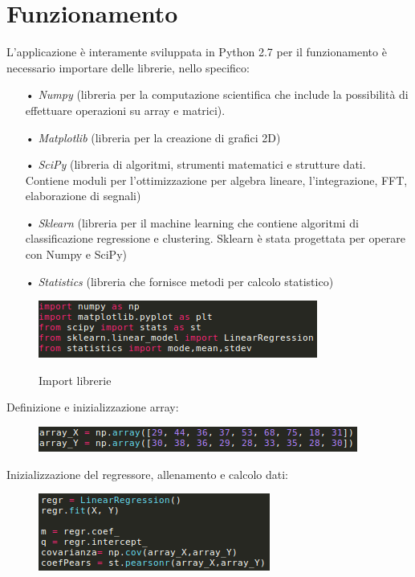 \documentclass[a4paper,12pt,titlepage,oneside,openany]{book}
\begin{document}
\chapter{Funzionamento}
L’applicazione è interamente sviluppata in Python 2.7 per il funzionamento è necessario importare delle librerie, nello specifico:
\begin{itemize}
	\item[•] \textit{Numpy} (libreria per la computazione scientifica che include la possibilità di effettuare operazioni su array e matrici).
	\item[•] \textit{Matplotlib} (libreria per la creazione di grafici 2D)
	\item[•] \textit{SciPy} (libreria di algoritmi, strumenti matematici e strutture dati. Contiene moduli per l’ottimizzazione per algebra lineare, l’integrazione, FFT, elaborazione di segnali)
	\item[•] \textit{Sklearn} (libreria per il machine learning che contiene algoritmi di classificazione regressione e clustering. Sklearn è stata progettata per operare con Numpy e SciPy)
	\item[•] \textit{Statistics} (libreria che fornisce metodi per calcolo statistico)
\end{itemize}
\begin{figure}[H]
	\centering	\includegraphics{importlib.png}
	\label{fig:importlib}
	\caption{Import librerie}
\end{figure}
\newpage
Definizione e inizializzazione array:
\begin{figure}[H]
	\centering	\includegraphics{array.png}
	\label{fig:array}
\end{figure}
Inizializzazione del regressore, allenamento e calcolo dati:
\begin{figure}[H]
	\centering	\includegraphics{regressioncode.png}
	\label{fig:regressioncode}
\end{figure}
\end{document}
